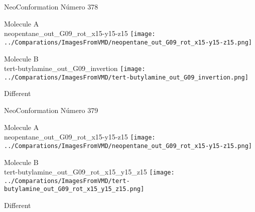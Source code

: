 \vtab[-2cm]
\begin{center}
{\large NeoConformation \tab Número 378}
\end{center}
\begin{multicols}{2}
\begin{center}
Molecule A \\ 
neopentane\_out\_G09\_rot\_x15-y15-z15
\texttt{[image: ../Comparations/ImagesFromVMD/neopentane\_out\_G09\_rot\_x15-y15-z15.png]}
\\
\vtab

\columnbreak
Molecule B \\ 
tert-butylamine\_out\_G09\_invertion
\texttt{[image: ../Comparations/ImagesFromVMD/tert-butylamine\_out\_G09\_invertion.png]}
\\
\vtab


\end{center}
\end{multicols}
\begin{center}
\vtab
\vtab
\textcolor{NavyBlue}{\Large Different}
\end{center}

 \newpage

\vtab[-2cm]
\begin{center}
{\large NeoConformation \tab Número 379}
\end{center}
\begin{multicols}{2}
\begin{center}
Molecule A \\ 
neopentane\_out\_G09\_rot\_x15-y15-z15
\texttt{[image: ../Comparations/ImagesFromVMD/neopentane\_out\_G09\_rot\_x15-y15-z15.png]}
\\
\vtab

\columnbreak
Molecule B \\ 
tert-butylamine\_out\_G09\_rot\_x15\_y15\_z15
\texttt{[image: ../Comparations/ImagesFromVMD/tert-butylamine\_out\_G09\_rot\_x15\_y15\_z15.png]}
\\
\vtab


\end{center}
\end{multicols}
\begin{center}
\vtab
\vtab
\textcolor{NavyBlue}{\Large Different}
\end{center}

 \newpage

